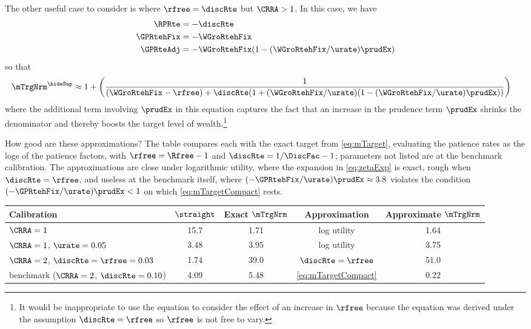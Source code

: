 \documentclass{econark}
\begin{document}
The other useful case to consider is where $\rfree = \discRte$ but $\CRRA>1$.  In this case, we have
\begin{equation}\begin{gathered}\begin{aligned}
    \RPRte & =  -\discRte
\\  \GPRtehFix & =  -\WGroRtehFix
\\  \GPRteAdj & =  -\WGroRtehFix (1-(\WGroRtehFix/\urate)\prudEx)
\end{aligned}\end{gathered}\end{equation}
so that
\begin{equation}\begin{gathered}\begin{aligned}
 \mTrgNrm^{\hideSup} & \approx  1 + \left(\frac{1}{(\WGroRtehFix-\rfree)+\discRte(1+(\WGroRtehFix/\urate)(1-(\WGroRtehFix/\urate)\prudEx))}\right)
\end{aligned}\end{gathered}\end{equation}
where the additional term involving $\prudEx$ in this equation
captures the fact that an increase in the prudence term $\prudEx$
shrinks the denominator and thereby boosts the target level of
wealth.\footnote{It would be inappropriate to use the equation to
  consider the effect of an increase in $\rfree$ because the equation was derived under the
  assumption $\discRte=\rfree$ so $\rfree$ is not free to vary.}


How good are these approximations?  The table compares each with the exact target from \eqref{eq:mTarget}, evaluating the patience rates as the logs of the patience factors, with $\rfree = \Rfree-1$ and $\discRte = 1/\DiscFac-1$; parameters not listed are at the benchmark calibration.  The approximations are close under logarithmic utility, where the expansion in \eqref{eq:zetaExp} is exact, rough when $\discRte = \rfree$, and useless at the benchmark itself, where $(-\GPRtehFix/\urate)\prudEx \approx 3.8$ violates the condition $(-\GPRtehFix/\urate)\prudEx < 1$ on which \eqref{eq:mTargetCompact} rests.
\begin{center}\small
\begin{tabular}{lcccc}
Calibration & $\straight$ & Exact $\mTrgNrm$ & Approximation & Approximate $\mTrgNrm$ \\ \hline
$\CRRA = 1$ & 15.7 & 1.71 & log utility & 1.64 \\
$\CRRA = 1$, $\urate = 0.05$ & 3.48 & 3.95 & log utility & 3.75 \\
$\CRRA = 2$, $\discRte = \rfree = 0.03$ & 1.74 & 39.0 & $\discRte = \rfree$ & 51.0 \\
benchmark ($\CRRA = 2$, $\discRte = 0.10$) & 4.09 & 5.48 & \eqref{eq:mTargetCompact} & 0.22
\end{tabular}
\end{center}
\end{document}

